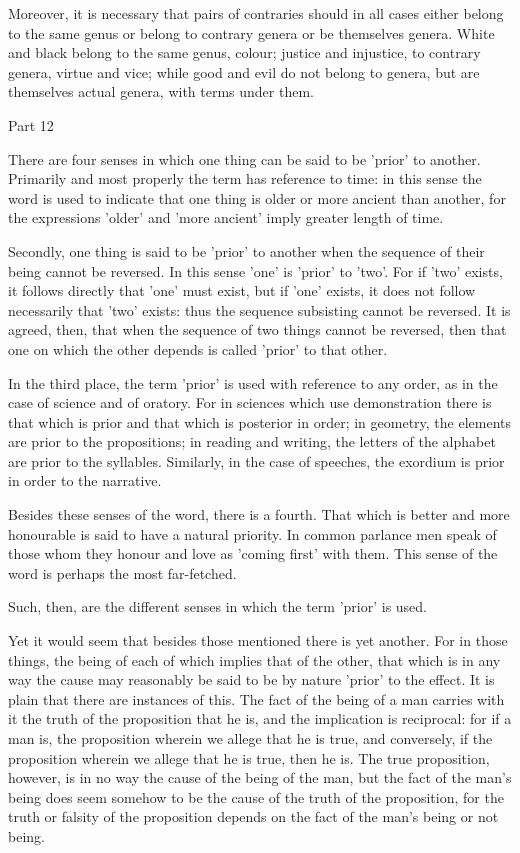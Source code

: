 Moreover, it is necessary that pairs of contraries should in all cases
either belong to the same genus or belong to contrary genera or be
themselves genera. White and black belong to the same genus, colour;
justice and injustice, to contrary genera, virtue and vice; while good
and evil do not belong to genera, but are themselves actual genera,
with terms under them.



Part 12

There are four senses in which one thing can be said to be 'prior' to
another. Primarily and most properly the term has reference to time: in
this sense the word is used to indicate that one thing is older or more
ancient than another, for the expressions 'older' and 'more ancient'
imply greater length of time.

Secondly, one thing is said to be 'prior' to another when the sequence
of their being cannot be reversed. In this sense 'one' is 'prior' to
'two'. For if 'two' exists, it follows directly that 'one' must exist,
but if 'one' exists, it does not follow necessarily that 'two' exists:
thus the sequence subsisting cannot be reversed. It is agreed, then,
that when the sequence of two things cannot be reversed, then that one
on which the other depends is called 'prior' to that other.

In the third place, the term 'prior' is used with reference to any
order, as in the case of science and of oratory. For in sciences which
use demonstration there is that which is prior and that which is
posterior in order; in geometry, the elements are prior to the
propositions; in reading and writing, the letters of the alphabet are
prior to the syllables. Similarly, in the case of speeches, the
exordium is prior in order to the narrative.

Besides these senses of the word, there is a fourth. That which is
better and more honourable is said to have a natural priority. In
common parlance men speak of those whom they honour and love as 'coming
first' with them. This sense of the word is perhaps the most
far-fetched.

Such, then, are the different senses in which the term 'prior' is used.

Yet it would seem that besides those mentioned there is yet another.
For in those things, the being of each of which implies that of the
other, that which is in any way the cause may reasonably be said to be
by nature 'prior' to the effect. It is plain that there are instances
of this. The fact of the being of a man carries with it the truth of
the proposition that he is, and the implication is reciprocal: for if a
man is, the proposition wherein we allege that he is true, and
conversely, if the proposition wherein we allege that he is true, then
he is. The true proposition, however, is in no way the cause of the
being of the man, but the fact of the man's being does seem somehow to
be the cause of the truth of the proposition, for the truth or falsity
of the proposition depends on the fact of the man's being or not being.

